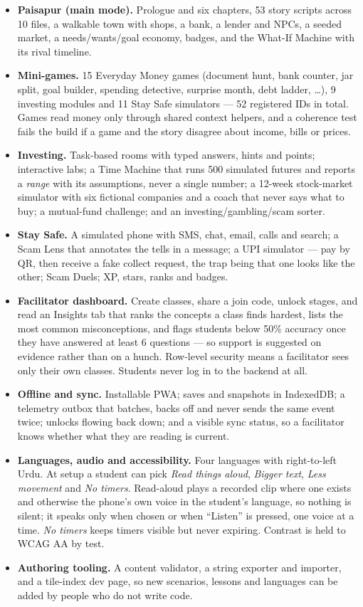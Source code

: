 \documentclass[10pt,a4paper]{article}
\begin{document}
\begin{itemize}
  \item \textbf{Paisapur (main mode).} Prologue and six chapters, 53 story scripts across 10 files, a walkable town with shops, a bank, a lender and NPCs, a seeded market, a needs/wants/goal economy, badges, and the What-If Machine with its rival timeline.
  \item \textbf{Mini-games.} 15 Everyday Money games (document hunt, bank counter, jar split, goal builder, spending detective, surprise month, debt ladder, \ldots), 9 investing modules and 11 Stay Safe simulators --- 52 registered IDs in total. Games read money only through shared context helpers, and a coherence test fails the build if a game and the story disagree about income, bills or prices.
  \item \textbf{Investing.} Task-based rooms with typed answers, hints and points; interactive labs; a Time Machine that runs 500 simulated futures and reports a \emph{range} with its assumptions, never a single number; a 12-week stock-market simulator with six fictional companies and a coach that never says what to buy; a mutual-fund challenge; and an investing/gambling/scam sorter.
  \item \textbf{Stay Safe.} A simulated phone with SMS, chat, email, calls and search; a Scam Lens that annotates the tells in a message; a UPI simulator --- pay by QR, then receive a fake collect request, the trap being that one looks like the other; Scam Duels; XP, stars, ranks and badges.
  \item \textbf{Facilitator dashboard.} Create classes, share a join code, unlock stages, and read an Insights tab that ranks the concepts a class finds hardest, lists the most common misconceptions, and flags students below 50\% accuracy once they have answered at least 6 questions --- so support is suggested on evidence rather than on a hunch. Row-level security means a facilitator sees only their own classes. Students never log in to the backend at all.
  \item \textbf{Offline and sync.} Installable PWA; saves and snapshots in IndexedDB; a telemetry outbox that batches, backs off and never sends the same event twice; unlocks flowing back down; and a visible sync status, so a facilitator knows whether what they are reading is current.
  \item \textbf{Languages, audio and accessibility.} Four languages with right-to-left Urdu. At setup a student can pick \emph{Read things aloud}, \emph{Bigger text}, \emph{Less movement} and \emph{No timers}. Read-aloud plays a recorded clip where one exists and otherwise the phone's own voice in the student's language, so nothing is silent; it speaks only when chosen or when ``Listen'' is pressed, one voice at a time. \emph{No timers} keeps timers visible but never expiring. Contrast is held to WCAG AA by test.
  \item \textbf{Authoring tooling.} A content validator, a string exporter and importer, and a tile-index dev page, so new scenarios, lessons and languages can be added by people who do not write code.
\end{itemize}
\end{document}
